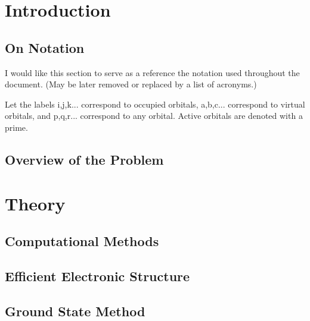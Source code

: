 \documentclass[letterpaper, 12pt]{article}
\begin{document}
\section{Introduction}
\subsection{On Notation}
I would like this section to serve as a reference the notation used throughout the document. (May be later removed or replaced by a list of acronyms.) 

 Let the labels i,j,k... correspond to occupied orbitals, a,b,c... correspond to virtual orbitals, and p,q,r... correspond to any orbital. Active orbitals are denoted with a prime.
\subsection{Overview of the Problem}
\section{Theory}
\subsection{Computational Methods}


\subsection{Efficient Electronic Structure}


\subsection{Ground State Method}

\end{document}
